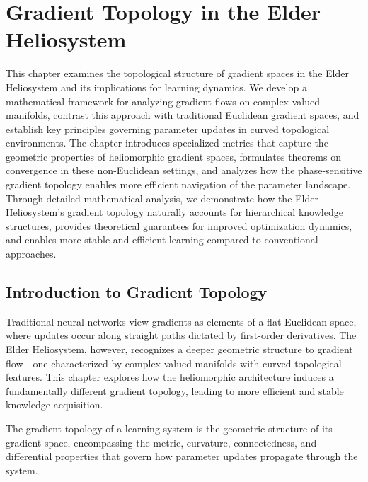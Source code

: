 \chapter{Gradient Topology in the Elder Heliosystem}

\begin{tcolorbox}[colback=PureBlue!5!white,colframe=PureBlue!75!black,title=Chapter Summary]
This chapter examines the topological structure of gradient spaces in the Elder Heliosystem and its implications for learning dynamics. We develop a mathematical framework for analyzing gradient flows on complex-valued manifolds, contrast this approach with traditional Euclidean gradient spaces, and establish key principles governing parameter updates in curved topological environments. The chapter introduces specialized metrics that capture the geometric properties of heliomorphic gradient spaces, formulates theorems on convergence in these non-Euclidean settings, and analyzes how the phase-sensitive gradient topology enables more efficient navigation of the parameter landscape. Through detailed mathematical analysis, we demonstrate how the Elder Heliosystem's gradient topology naturally accounts for hierarchical knowledge structures, provides theoretical guarantees for improved optimization dynamics, and enables more stable and efficient learning compared to conventional approaches.
\end{tcolorbox}

\section{Introduction to Gradient Topology}

Traditional neural networks view gradients as elements of a flat Euclidean space, where updates occur along straight paths dictated by first-order derivatives. The Elder Heliosystem, however, recognizes a deeper geometric structure to gradient flow—one characterized by complex-valued manifolds with curved topological features. This chapter explores how the heliomorphic architecture induces a fundamentally different gradient topology, leading to more efficient and stable knowledge acquisition.

\begin{definition}
The gradient topology of a learning system is the geometric structure of its gradient space, encompassing the metric, curvature, connectedness, and differential properties that govern how parameter updates propagate through the system.
\end{definition}

